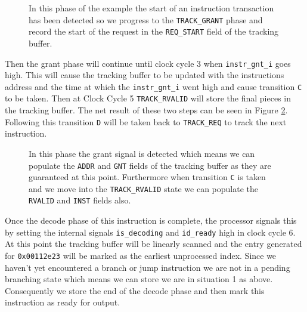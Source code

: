 \begin{figure}[htbp]
	\begin{subfigure}{\linewidth}
		
	\end{subfigure}
	\begin{subfigure}{\linewidth}
		
	\end{subfigure}
	\caption{In this phase of the example the start of an instruction transaction has been detected so we progress to the \texttt{TRACK\_GRANT} phase and record the start of the request in the \texttt{REQ\_START} field of the tracking buffer.}
	\label{fig:load-example-step-1}
\end{figure}


Then the grant phase will continue until clock cycle 3 when \texttt{instr\_gnt\_i} goes high. This will cause the tracking buffer to be updated with the instructions address and the time at which the \texttt{instr\_gnt\_i} went high and cause transition \texttt{C} to be taken. Then at Clock Cycle 5 \texttt{TRACK\_RVALID} will store the final pieces in the tracking buffer. The net result of these two steps can be seen in Figure \ref{fig:load-example-step-2}. Following this transition \texttt{D} will be taken back to \texttt{TRACK\_REQ} to track the next instruction.

\begin{figure}[htbp]
	\begin{subfigure}{\linewidth}
		
	\end{subfigure}
	\begin{subfigure}{\linewidth}
		
	\end{subfigure}
	\caption{In this phase the grant signal is detected which means we can populate the \texttt{ADDR} and \texttt{GNT} fields of the tracking buffer as they are guaranteed at this point. Furthermore when transition \texttt{C} is taken and we move into the \texttt{TRACK\_RVALID} state we can populate the \texttt{RVALID} and \texttt{INST} fields also.}
	\label{fig:load-example-step-2}
\end{figure}

Once the decode phase of this instruction is complete, the processor signals this by setting the internal signals \texttt{is\_decoding} and \texttt{id\_ready} high in clock cycle 6. At this point the tracking buffer will be linearly scanned and the entry generated for \texttt{0x00112e23} will be marked as the earliest unprocessed index. Since we haven't yet encountered a branch or jump instruction we are not in a pending branching state which means we can store we are in situation 1 as above. Consequently we store the end of the decode phase and then mark this instruction as ready for output. 

